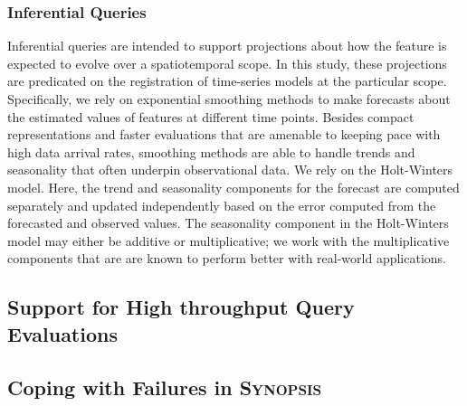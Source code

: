 \subsubsection{Inferential Queries}
Inferential queries are intended to support projections about how the feature is expected to evolve over a spatiotemporal scope. In this study, these projections are predicated on the registration of time-series models at the particular scope. Specifically, we rely on exponential smoothing methods to make forecasts about the estimated values of features at different time points. Besides compact representations and faster evaluations that are amenable to keeping pace with high data arrival rates, smoothing methods are able to handle trends and seasonality that often underpin observational data. We rely on the Holt-Winters model. Here, the trend and seasonality components for the forecast are computed separately and updated independently based on the error computed from the forecasted and observed values. The seasonality component in the Holt-Winters model may either be additive or multiplicative; we work with the multiplicative components that are are known to perform better with real-world applications. 

\subsection{Support for High throughput Query Evaluations}

\subsection{Coping with Failures in \textsc{Synopsis}}


